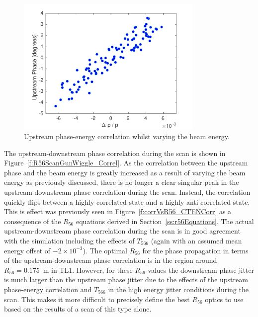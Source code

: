 \begin{figure}
  \centering
  \includegraphics[width=0.8\textwidth]{Figures/propagation/R56ScanGunWiggle_UpEnCorr}
  \caption{Upstream phase-energy correlation whilst varying the beam energy.}
  \label{f:R56ScanGunWiggle_UpEnCorr}
\end{figure}

The upstream-downstream phase correlation during the scan is shown in Figure~\ref{f:R56ScanGunWiggle_Correl}. As the correlation between the upstream phase and the beam energy is greatly increased as a result of varying the beam energy as previously discussed, there is no longer a clear singular peak in the upstream-downstream phase correlation during the scan. Instead, the correlation quickly flips between a highly correlated state and a highly anti-correlated state. This is effect was previously seen in Figure~\ref{f:corrVsR56_CTENCorr} as a consequence of the \(R_{56}\) equations derived in Section~\ref{ss:r56Equations}. The actual upstream-downstream phase correlation during the scan is in good agreement with the simulation including the effects of \(T_{566}\) (again with an assumed mean energy offset of \(-2\times10^{-3}\)). The optimal \(R_{56}\) for the phase propagation in terms of the upstream-downstream phase correlation is in the region around \(R_{56}=0.175\)~m in TL1. However, for these \(R_{56}\) values the downstream phase jitter is much larger than the upstream phase jitter due to the effects of the upstream phase-energy correlation and \(T_{566}\) in the high energy jitter conditions during the scan. This makes it more difficult to precisely define the best \(R_{56}\) optics to use based on the results of a scan of this type alone.

